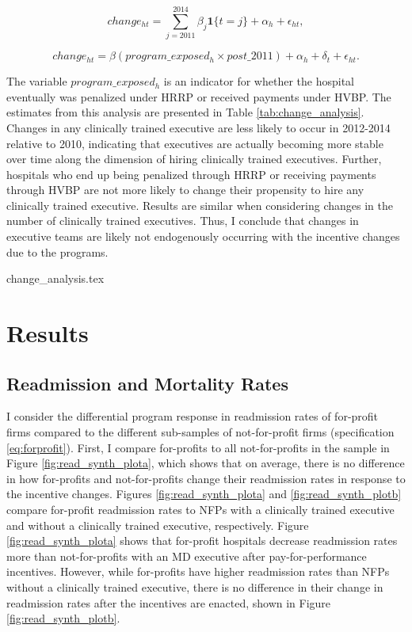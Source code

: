 \documentclass[12pt]{article}
\begin{document}
    \begin{equation}\label{eq:change1}
    change_{ht} = \sum_{j=2011}^{2014}\beta_j\mathbf{1}\{t=j\} + \alpha_h + \epsilon_{ht},
    \end{equation}

    \begin{equation}\label{eq:change2}
    change_{ht} = \beta(program\_exposed_{h} \times post\_2011)+ \alpha_h + \delta_t + \epsilon_{ht}.
    \end{equation}

    The variable $program\_exposed_{h}$ is an indicator for whether the hospital eventually was penalized under HRRP or received payments under HVBP. The estimates from this analysis are presented in Table \ref{tab:change_analysis}. Changes in any clinically trained executive are less likely to occur in 2012-2014 relative to 2010, indicating that executives are actually becoming more stable over time along the dimension of hiring clinically trained executives. Further, hospitals who end up being penalized through HRRP or receiving payments through HVBP are not more likely to change their propensity to hire any clinically trained executive. Results are similar when considering changes in the number of clinically trained executives. Thus, I conclude that changes in executive teams are likely not endogenously occurring with the incentive changes due to the programs. 

     {change_analysis.tex}

    

    
    
    \section{Results}

     
     \subsection{Readmission and Mortality Rates}

     I consider the differential program response in readmission rates of for-profit firms compared to the different sub-samples of not-for-profit firms (specification \ref{eq:forprofit}). First, I compare for-profits to all not-for-profits in the sample in Figure \ref{fig:read_synth_plota}, which shows that on average, there is no difference in how for-profits and not-for-profits change their readmission rates in response to the incentive changes. Figures \ref{fig:read_synth_plota} and \ref{fig:read_synth_plotb} compare for-profit readmission rates to NFPs with a clinically trained executive and without a clinically trained executive, respectively. Figure \ref{fig:read_synth_plota} shows that for-profit hospitals decrease readmission rates more than not-for-profits with an MD executive after pay-for-performance incentives. However, while for-profits have higher readmission rates than NFPs without a clinically trained executive, there is no difference in their change in readmission rates after the incentives are enacted, shown in Figure \ref{fig:read_synth_plotb}. 
\end{document}
